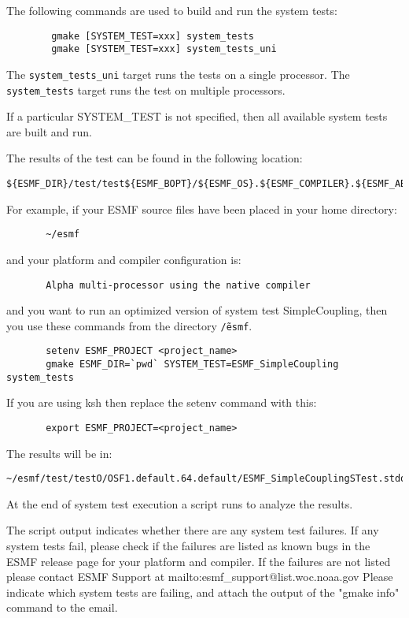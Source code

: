 The following commands are used to build and run the system tests:

\begin{verbatim}
        gmake [SYSTEM_TEST=xxx] system_tests
        gmake [SYSTEM_TEST=xxx] system_tests_uni
\end{verbatim}

The {\tt system\_tests\_uni} target runs the tests on a single processor. 
The {\tt system\_tests} target runs the test on multiple processors.

If a particular SYSTEM\_TEST is not specified, then all available system tests 
are built and run.

The results of the test can be found in the following location:
\begin{verbatim}
${ESMF_DIR}/test/test${ESMF_BOPT}/${ESMF_OS}.${ESMF_COMPILER}.${ESMF_ABI}.${ESMF_SITE}
\end{verbatim}

For example, if your ESMF source files have been placed in your home directory:
\begin{verbatim}
       ~/esmf
\end{verbatim}

and your platform and compiler configuration is:
\begin{verbatim}
       Alpha multi-processor using the native compiler
\end{verbatim}

and you want to run an optimized version of system test SimpleCoupling,
then you use these commands from the directory {\tt \~/esmf}. 
\begin{verbatim}
       setenv ESMF_PROJECT <project_name>
       gmake ESMF_DIR=`pwd` SYSTEM_TEST=ESMF_SimpleCoupling system_tests
\end{verbatim}

If you are using ksh then replace the setenv command with
this:

\begin{verbatim}
       export ESMF_PROJECT=<project_name>
\end{verbatim}

The results will be in:
\begin{verbatim}
~/esmf/test/testO/OSF1.default.64.default/ESMF_SimpleCouplingSTest.stdout
\end{verbatim}

At the end of system test execution a script runs to analyze the results.


The script output indicates whether there are any system test failures.
If any system tests fail, please check if the failures are listed as known bugs in the ESMF release
page 
for your platform and compiler.
If the failures are not listed please contact ESMF Support at 
{mailto:esmf\_support@list.woc.noaa.gov}
Please indicate which system tests are failing, and attach the output of the "gmake info" command to the email.



